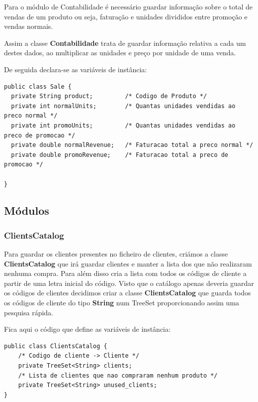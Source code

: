 \documentclass[10pt] {article}
\begin{document}
Para o módulo de Contabilidade é necessário guardar informação sobre o total de vendas de um produto ou seja, faturação e unidades divididos entre promoção e vendas normais.

Assim a classe \textbf{Contabilidade} trata de guardar informação relativa a cada um destes dados, ao multiplicar as unidades e preço por unidade de uma venda.

De seguida declara-se as variáveis de instância:

\begin{lstlisting}
public class Sale {
  private String product;         /* Codigo de Produto */
  private int normalUnits;        /* Quantas unidades vendidas ao preco normal */
  private int promoUnits;         /* Quantas unidades vendidas ao preco de promocao */
  private double normalRevenue;   /* Faturacao total a preco normal */
  private double promoRevenue;    /* Faturacao total a preco de promocao */

}
\end{lstlisting}

\subsection{Módulos}

\subsubsection{ClientsCatalog\label{catalogoclientes}}

Para guardar os clientes presentes no ficheiro de clientes, criámos a classe \color{blue} \textbf{ClientsCatalog} \color{black} que
irá guardar clientes e manter a lista dos que não realizaram nenhuma compra.
Para além disso cria a lista com todos os códigos de cliente a partir de uma letra inicial do código. Visto que o catálogo apenas deveria guardar os códigos de clientes decidimos criar a classe \color{blue} \textbf{ClientsCatalog}
\color{black} que guarda todos os códigos de cliente do tipo \color{blue} \textbf{String} \color{black} num TreeSet
proporcionando assim uma pesquisa rápida.

Fica aqui o código que define as variáveis de instância:

\begin{lstlisting}
public class ClientsCatalog {
	/* Codigo de cliente -> Cliente */
	private TreeSet<String> clients;
	/* Lista de clientes que nao compraram nenhum produto */
	private TreeSet<String> unused_clients;
}
\end{lstlisting}
\end{document}
